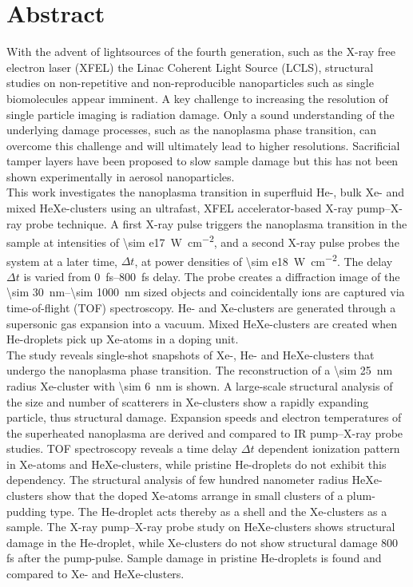 \section*{Abstract}\label{ch:abstract}
With the advent of lightsources of the fourth generation, such as the X-ray free electron laser (XFEL) the Linac Coherent Light Source (LCLS), structural studies on non-repetitive and non-reproducible nanoparticles such as single biomolecules appear imminent. A key challenge to increasing the resolution of single particle imaging is radiation damage. Only a sound understanding of the underlying damage processes, such as the nanoplasma phase transition, can overcome this challenge and will ultimately lead to higher resolutions. Sacrificial tamper layers have been proposed to slow sample damage but this has not been shown experimentally in aerosol nanoparticles.\\[1\baselineskip]
This work investigates the nanoplasma transition in superfluid He-, bulk Xe- and mixed HeXe-clusters using an ultrafast, XFEL accelerator-based X-ray pump--X-ray probe technique. A first X-ray pulse triggers the nanoplasma transition in the sample at intensities of \SI{\sim e17}{\watt\per\square\centi\meter}, and a second X-ray pulse probes the system at a later time, $\Delta t$, at power densities of \SI{\sim e18}{\watt\per\square\centi\meter}. The delay $\Delta t$ is varied from \SIrange{0}{800}{\femto\second} delay. The probe creates a diffraction image of the \SIrange{\sim 30}{\sim 1000}{\nano\meter} sized objects and coincidentally ions are captured via time-of-flight (TOF) spectroscopy. He- and Xe-clusters are generated through a supersonic gas expansion into a vacuum. Mixed HeXe-clusters are created when He-droplets pick up Xe-atoms in a doping unit.\\[1\baselineskip]
The study reveals single-shot snapshots of Xe-, He- and HeXe-clusters that undergo the nanoplasma phase transition. The reconstruction of a \SI{\sim 25}{\nano\meter} radius Xe-cluster with \SI{\sim 6}{\nano\meter} is shown. A large-scale structural analysis of the size and number of scatterers in Xe-clusters show a rapidly expanding particle, thus structural damage. Expansion speeds and electron temperatures of the superheated nanoplasma are derived and compared to IR pump--X-ray probe studies. TOF spectroscopy reveals a time delay $\Delta t$ dependent ionization pattern in Xe-atoms and HeXe-clusters, while pristine He-droplets do not exhibit this dependency. The structural analysis of few hundred nanometer radius HeXe-clusters show that the doped Xe-atoms arrange in small clusters of a plum-pudding type. The He-droplet acts thereby as a shell and the Xe-clusters as a sample. The X-ray pump--X-ray probe study on HeXe-clusters shows structural damage in the He-droplet, while Xe-clusters do not show structural damage 800 fs after the pump-pulse. Sample damage in pristine He-droplets is found and compared to Xe- and HeXe-clusters.
%
%
%
%